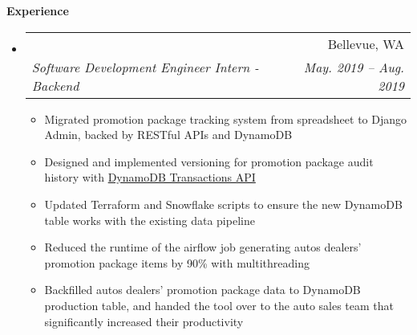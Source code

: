 \documentclass{article}
\makeatletter
\newcommand{\resitem}[1]{
    \item #1
    \vspace{-2pt}
}
\newcommand{\resheading}[1]{{\large \colorbox{mygrey}{\begin{minipage}{\textwidth}{\textbf{#1 \vphantom{p\^{E}}}}\end{minipage}}}}
\newcommand{\ressubheading}[4]{
\begin{tabular*}{6.80in}{l@{\extracolsep{\fill}}r}
    \textbf{#1} & #2 \\
    \textit{#3} & \textit{#4} \\
\end{tabular*}\vspace{-6pt}}
\makeatother
\begin{document}

    \resheading{Experience}

    \begin{itemize}
        \item
        \ressubheading
        {\href
            {https://offerup.com/}
            {OfferUp, Inc - Autos Team}
        }
        {Bellevue, WA}
        {Software Development Engineer Intern - Backend}
        {May. 2019 -- Aug. 2019}
        {\footnotesize
        \begin{itemize} %
            \resitem
            {Migrated promotion package tracking system from spreadsheet to Django Admin,
            backed by RESTful APIs and DynamoDB}
            \resitem
            {Designed and implemented versioning for promotion package audit history with
            \href{https://docs.aws.amazon.com/amazondynamodb/latest/developerguide/transactions.html}
                 {DynamoDB Transactions API}
            }
            \resitem
            {Updated Terraform and Snowflake scripts to ensure
            the new DynamoDB table works with the existing data pipeline}
            \resitem
            {Reduced the runtime of the airflow job generating autos dealers' promotion package items
            by 90\% with multithreading}
            \resitem
            {Backfilled autos dealers' promotion package data to DynamoDB production table, and
            handed the tool over to the auto sales team that significantly increased their productivity}
        \end{itemize}
        }


\end{itemize}
\end{document}
